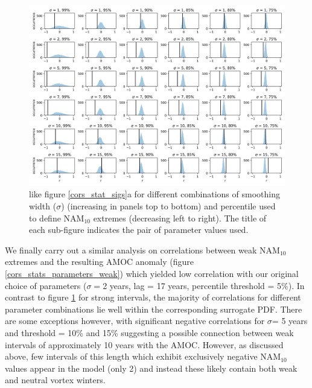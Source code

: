 \newpage
\begin{landscape}
\begin{figure}[h!]
\begin{center}
\noindent\includegraphics[width =0.9\linewidth]{Figures/Figures-surface/cors_sigs_thresh_and_sigma.png} 
\caption[PDFs for correlations between the magnitude of strong NAM$_{10}$ extreme and lagged AMOC for different $\sigma$ and threshold]{like figure \ref{cors_stat_sigs}a for different combinations of smoothing width ($\sigma$) (increasing in panels top to bottom) and percentile used to define NAM$_{10}$ extremes (decreasing left to right). The title of each sub-figure indicates the pair of parameter values used.}%
\label{cors_stats_parameters_strong}
\end{center}
\end{figure}
\end{landscape}

We finally carry out a similar analysis on correlations between weak NAM$_{10}$ extremes and the resulting AMOC anomaly (figure \ref{cors_stats_parameters_weak}) which yielded low correlation with our original choice of parameters ($\sigma =$2 years, lag = 17 years, percentile threshold = 5\%). In contrast to figure \ref{cors_stats_parameters_strong} for strong intervals, the majority of correlations for different parameter combinations lie well within the corresponding surrogate PDF. There are some exceptions however, with significant negative correlations for $\sigma$= 5 years and threshold = 10\% and 15\% suggesting a possible connection between weak intervals of approximately 10 years with the AMOC. However, as discussed above, few intervals of this length which exhibit exclusively negative NAM$_{10}$ values appear in the model (only 2) and instead these likely contain both weak and neutral vortex winters. 

